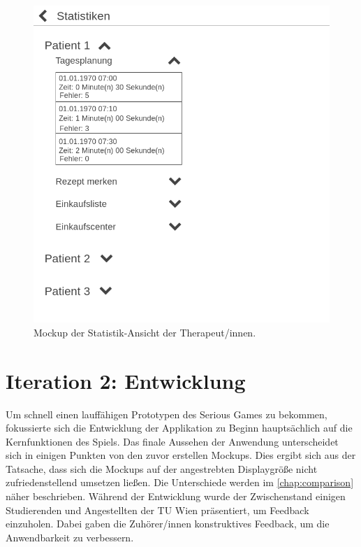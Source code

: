 \begin{figure}[H]
    \centering
	\includegraphics[width=0.5\linewidth]{figures/development/mockup/statistics-therapists.png}
	\caption{Mockup der Statistik-Ansicht der Therapeut/innen.}
	\label{fig:mockup-statistics-therapists}
\end{figure}

\section{Iteration 2: Entwicklung}\label{sec:iteration2}
Um schnell einen lauffähigen Prototypen des Serious Games zu bekommen, fokussierte sich die Entwicklung der Applikation zu Beginn hauptsächlich auf die Kernfunktionen des Spiels. Das finale Aussehen der Anwendung unterscheidet sich in einigen Punkten von den zuvor erstellen Mockups. Dies ergibt sich aus der Tatsache, dass sich die Mockups auf der angestrebten Displaygröße nicht zufriedenstellend umsetzen ließen. Die Unterschiede werden im \autoref{chap:comparison} näher beschrieben. Während der Entwicklung wurde der Zwischenstand einigen Studierenden und Angestellten der TU Wien präsentiert, um Feedback einzuholen. Dabei gaben die Zuhörer/innen konstruktives Feedback, um die Anwendbarkeit zu verbessern. 

